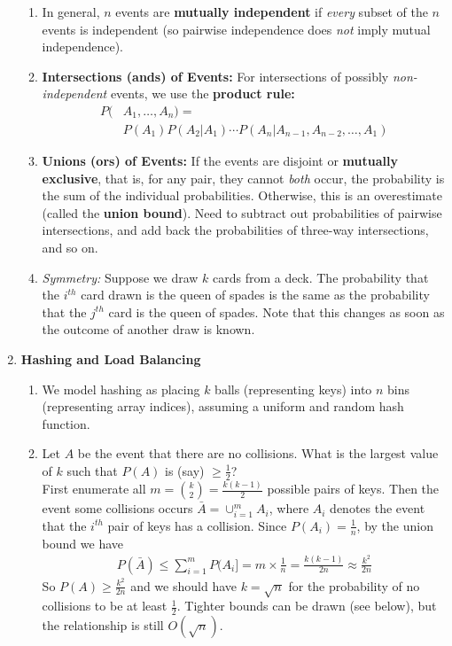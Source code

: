 \documentclass[10pt]{article}
\begin{document}
\begin{multicols}{2}
\begin{enumerate}
\begin{enumerate}
            \item In general, $n$ events are \textbf{mutually independent} if \textit{every} subset of the $n$ events is independent (so pairwise independence does \textit{not} imply mutual independence).
            \item \textbf{Intersections (ands) of Events:} For intersections of possibly \textit{non-independent} events, we use the \textbf{product rule:} 
            \begin{align*}
            P(&A_1,\hdots,A_n)= \\
            &P(A_1)P(A_2|A_1) \cdots P(A_n|A_{n-1},A_{n-2},\hdots, A_1)
            \end{align*}
            \item \textbf{Unions (ors) of Events:} 
            If the events are disjoint or \textbf{mutually exclusive}, that is, for any pair, they cannot \textit{both} occur, the probability is the sum of the individual probabilities. Otherwise, this is an overestimate (called the \textbf{union bound}). Need to subtract out probabilities of pairwise intersections, and add back the probabilities of three-way intersections, and so on. 
            
            \item \textit{Symmetry:} Suppose we draw $k$ cards from a deck. The probability that the $i^{th}$ card drawn is the queen of spades is the same as the probability that the $j^{th}$ card is the queen of spades. Note that this changes as soon as the outcome of another draw is known.

        \end{enumerate}
        
        \item \textbf{Hashing and Load Balancing} 
        \begin{enumerate}
            \item We model hashing as placing $k$ balls (representing keys) into $n$ bins (representing array indices), assuming a uniform and random hash function. 
            \item Let $A$ be the event that there are no collisions. What is the largest value of $k$ such that $P(A)$ is (say) $\geq \frac{1}{2}$? \\ First enumerate all $m={k \choose 2} = \frac{k(k-1)}{2}$ possible pairs of keys. Then the event some collisions occurs $\bar A = \cup_{i=1}^{m} A_i$, where $A_i$ denotes the event that the $i^{th}$ pair of keys has a collision. Since $P(A_i)=\frac{1}{n}$, by the union bound we have
            \begin{align*}
                P(\bar A) \leq \sum_{i=1}^{m} P(A_i] = m \times \frac{1}{n} = \frac{k(k-1)}{2n} \approx \frac{k^2}{2n}
            \end{align*}
            So $P(A) \geq \frac{k^2}{2n}$ and we should have $k=\sqrt{n}$ for the probability of no collisions to be at least $\frac{1}{2}$. Tighter bounds can be drawn (see below), but the relationship is still $O(\sqrt{n})$.
            

\end{enumerate}
\end{enumerate}
\end{multicols}
\end{document}
